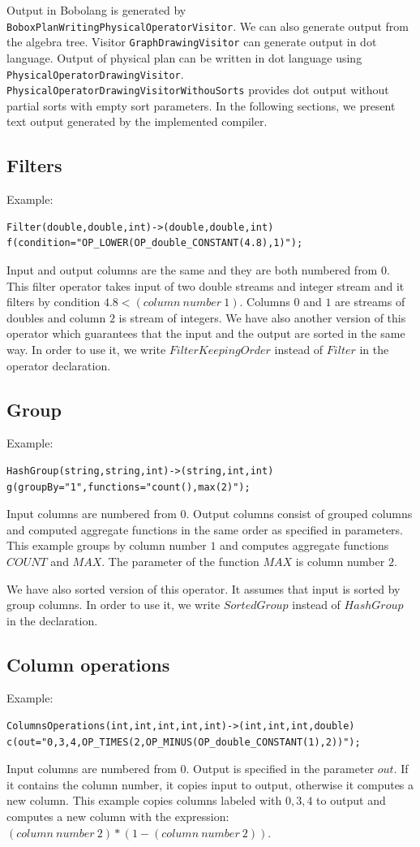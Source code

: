  Output in Bobolang is generated by \texttt{BoboxPlanWritingPhysicalOperatorVisitor}. We can also generate output from the algebra tree. Visitor \texttt{GraphDrawingVisitor} can generate output in dot language. Output of physical plan can be written in dot language using \texttt{Physical\-Operator\-Drawing\-Visitor}. \texttt{Physical\-Operator\-Drawing\-Visitor\-WithouSorts} provides dot output without partial sorts with empty sort parameters. In the following sections, we present text output generated by the implemented compiler.

\subsection{Filters}
Example: 
\begin{lstlisting}
Filter(double,double,int)->(double,double,int)
f(condition="OP_LOWER(OP_double_CONSTANT(4.8),1)"); 
\end{lstlisting}

Input and output columns are the same and they are both numbered from $0$.
This filter operator takes input of two double streams and integer stream and it filters by condition $4.8<(column~number~1)$. Columns $0$ and $1$ are streams of doubles and column $2$ is stream of integers. We have also another version of this operator which guarantees that the input and the output are sorted in the same way. In order to use it, we write $FilterKeepingOrder$ instead of $Filter$ in the operator declaration. 

\subsection{Group}
Example: 
\begin{lstlisting}
HashGroup(string,string,int)->(string,int,int)
g(groupBy="1",functions="count(),max(2)");
\end{lstlisting}
Input columns are numbered from $0$. Output columns consist of grouped columns and computed aggregate functions in the same order as specified in parameters. 
This example groups by column number $1$ and computes aggregate functions $COUNT$ and $MAX$. The parameter of the function $MAX$ is column number $2$. 

We have also sorted version of this operator. It assumes that input is sorted by group columns. In order to use it, we write $SortedGroup$ instead of $HashGroup$ in the declaration.

\subsection{Column operations}
Example: 
\begin{lstlisting} 
ColumnsOperations(int,int,int,int,int)->(int,int,int,double)
c(out="0,3,4,OP_TIMES(2,OP_MINUS(OP_double_CONSTANT(1),2))"); 
\end{lstlisting}
Input columns are numbered from $0$. Output is specified in the parameter $out$. If it contains the column number, it copies input to output, otherwise it computes a new column. 
This example copies columns labeled with $0,3,4$ to output and computes a new column with the expression: $(column~number~2)*(1-(column~number~2))$.

